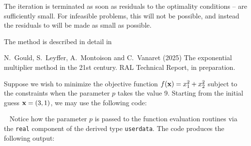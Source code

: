\documentclass{galahad}
\newcommand{\package}{expo}
\begin{document}
The iteration is terminated as soon as residuals to the
optimality conditions -- are sufficiently small. For 
infeasible problems, this will not be possible, and instead the
residuals to   will be made as small as possible.

\galreferences
\vspace*{1mm}

\noindent
The method is described in detail in
\vspace*{1mm}

\noindent
N.\ Gould, S.\ Leyffer, A.\ Montoison and C.\ Vanaret (2025)
The exponential multiplier method in the 21st century.
RAL Technical Report, in preparation.


\galexamples
Suppose we wish to minimize the objective function
$f({\mathbf{x}}) = x_1^2 + x_2^2$ subject to the constraints
when the parameter $p$ takes the value 9.
Starting from the initial guess ${\mathbf{x}} = (3,1)$, we may use the following code:

\renewcommand{\packagedir}{\galahaddir/src/forthcoming/\package}
{\tt \small
\VerbatimInput{\packageexample}
}
\noindent
Notice how the parameter $p$ is passed to the function evaluation
routines via the {\tt real} component of the derived type {\tt userdata}.
The code produces the following output:
{\tt \small
\VerbatimInput{\packageresults}
}
\noindent
\end{document}
